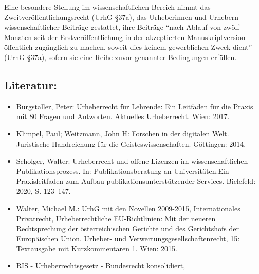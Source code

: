 \documentclass{article}
\begin{document}
        Eine besondere Stellung im wissenschaftlichen Bereich nimmt das
                  Zweitveröffentlichungsrecht (UrhG §37a), das Urheberinnen und Urhebern
                  wissenschaftlicher Beiträge gestattet, ihre Beiträge “nach Ablauf von zwölf
                  Monaten seit der Erstveröffentlichung in der akzeptierten Manuskriptversion
                  öffentlich zugänglich zu machen, soweit dies keinem gewerblichen Zweck dient”
                  (UrhG §37a), sofern sie eine Reihe zuvor genannter Bedingungen
                  erfüllen.\\
            
        \subsection*{Literatur:}\begin{itemize}\item Burgstaller, Peter: Urheberrecht für Lehrende: Ein Leitfaden für die Praxis
                              mit 80 Fragen und Antworten. Aktuelles Urheberrecht. Wien: 2017.\item Klimpel, Paul; Weitzmann, John H: Forschen in der digitalen Welt. Juristische Handreichung
                              für die Geisteswissenschaften. Göttingen: 2014.\item Scholger, Walter: Urheberrecht und offene Lizenzen im wissenschaftlichen
                              Publikationsprozess. In: Publikationsberatung an Universitäten.Ein
                              Praxisleitfaden zum Aufbau publikationsunterstützender
                              Services. Bielefeld: 2020, S. 123–147.\item Walter, Michael M.: UrhG mit den Novellen 2009-2015, Internationales
                              Privatrecht, Urheberrechtliche EU-Richtlinien: Mit der neueren
                              Rechtsprechung der österreichischen Gerichte und des Gerichtshofs der
                              Europäischen Union. Urheber- und Verwertungsgesellschaftenrecht‚ 15:
                              Textausgabe mit Kurzkommentaren 1. Wien: 2015.\item RIS - Urheberrechtsgesetz - Bundesrecht konsolidiert,

\end{itemize}
\end{document}
